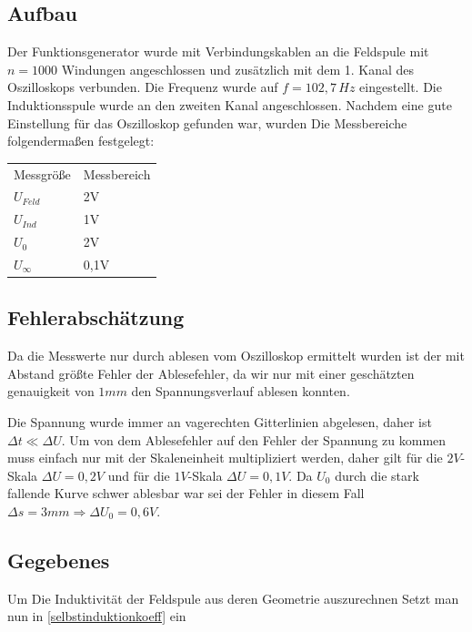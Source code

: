 \documentclass{article}
\begin{document}
\subsection{Aufbau}
Der Funktionsgenerator wurde mit Verbindungskablen an die Feldspule mit \(n=1000\) Windungen angeschlossen und zusätzlich mit dem 1. Kanal des Oszilloskops verbunden. Die Frequenz wurde auf \(f=102,7\,Hz\) eingestellt. Die Induktionsspule wurde an den zweiten Kanal angeschlossen. Nachdem eine gute Einstellung für das Oszilloskop gefunden war, wurden Die Messbereiche folgendermaßen festgelegt:
\begin{center}
\begin{tabular}{l l} 
Messgröße & Messbereich \\
  \(U_{Feld}\) & 2V \\ 
  \(U_{Ind}\) & 1V \\ 
  \(U_0\) & 2V \\ 
  \(U_\infty \) & 0,1V \\ 
 \end{tabular}
\end{center}

\subsection{Fehlerabschätzung}

Da die Messwerte nur durch ablesen vom Oszilloskop ermittelt wurden ist der mit Abstand größte Fehler der Ablesefehler, da wir nur mit einer geschätzten genauigkeit von \( 1mm \) den Spannungsverlauf ablesen konnten.

Die Spannung wurde immer an vagerechten Gitterlinien abgelesen, daher ist \(\Delta t \ll \Delta U \). Um von dem Ablesefehler auf den Fehler der Spannung zu kommen muss einfach nur mit der Skaleneinheit multipliziert werden, daher gilt für die \(2V\)-Skala \(\Delta U = 0,2V\) und für die \(1V\)-Skala \(\Delta U = 0,1V\). Da \(U_0\) durch die stark fallende Kurve schwer ablesbar war sei der Fehler in diesem Fall \(\Delta s = 3mm \Rightarrow \Delta U_0 = 0,6V \).

\subsection{Gegebenes}

Um Die Induktivität der Feldspule aus deren Geometrie auszurechnen Setzt man nun in \eqref{selbstinduktionkoeff} ein
\end{document}
